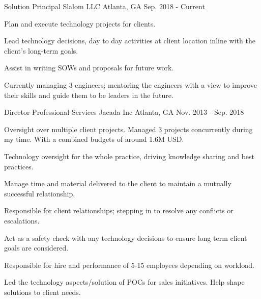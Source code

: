 

\begin{cventries}

  \cventry
    {Solution Principal} %
    {Slalom LLC} %
    {Atlanta, GA} %
    {Sep. 2018 - Current} %
    {
      \begin{cvitems} %
        \item {Plan and execute technology projects for clients.}
        \item {Lead technology decisions, day to day activities at client location inline with the client’s long-term goals.}
        \item {Assist in writing SOWs and proposals for future work.}
        \item {Currently managing 3 engineers; mentoring the engineers with a view to improve their skills and guide them to be leaders in the future.}
      \end{cvitems}
    }
    
  \cventry
  {Director Professional Services} %
  {Jacada Inc} %
  {Atlanta, GA} %
  {Nov. 2013 - Sep. 2018} %
  {
    \begin{cvitems} %
      \item {Oversight over multiple client projects. Managed 3 projects concurrently during my time. With a combined budgets of around 1.6M USD.}
      \item {Technology oversight for the whole practice, driving knowledge sharing and best practices.}
      \item {Manage time and material delivered to the client to maintain a mutually successful relationship.}
      \item {Responsible for client relationships; stepping in to resolve any conflicts or escalations.}
      \item {Act as a safety check with any technology decisions to ensure long term client goals are considered.}
      \item {Responsible for hire and performance of 5-15 employees depending on workload.}
      \item {Led the technology aspects/solution of POCs for sales initiatives. Help shape solutions to client needs.}
    \end{cvitems}
  }

\end{cventries}
